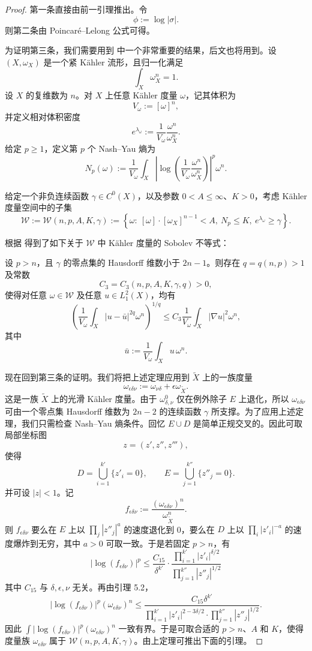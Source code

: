 \begin{proof}
第一条直接由前一引理推出。令
\[
\phi:=\log|\sigma|.
\]
则第二条由 Poincar\'e--Lelong 公式可得。

为证明第三条，我们需要用到 \cite{Go-Ph-So-Ja} 中一个非常重要的结果，后文也将用到。设 \((X,\omega_X)\) 是一个紧 Kähler 流形，且归一化满足
\[
\int_X \omega_X^n=1.
\]
设 \(X\) 的复维数为 \(n\)。对 \(X\) 上任意 Kähler 度量 \(\omega\)，记其体积为
\[
V_\omega:=[\omega]^n,
\]
并定义相对体积密度
\[
e^{\lambda_\omega}
:=
\frac{1}{V_\omega}\frac{\omega^n}{\omega_X^n}.
\]
给定 \(p\ge 1\)，定义第 \(p\) 个 Nash--Yau 熵为
\[
N_p(\omega)
:=
\frac1{V_\omega}
\int_X
\left|
\log\left(\frac1{V_\omega}\frac{\omega^n}{\omega_X^n}\right)
\right|^p\omega^n.
\]

给定一个非负连续函数 \(\gamma\in C^0(X)\)，以及参数 \(0<A\le \infty\)、\(K>0\)，考虑 Kähler 度量空间中的子集
\[
\mathcal W:=\mathcal W(n,p,A,K,\gamma)
:=
\left\{
\omega:\ [\omega]\cdot [\omega_X]^{n-1}<A,\ N_p\le K,\ e^{\lambda_\omega}\ge \gamma
\right\}.
\]

根据\cite[Theorem 2.1]{Go-Ph-So-Ja} 得到了如下关于 \(\mathcal{W}\) 中 Kähler 度量的 Sobolev 不等式：

\begin{theorem}
设 \(p>n\)，且 \(\gamma\) 的零点集的 Hausdorff 维数小于 \(2n-1\)。则存在 \(q=q(n,p)>1\) 及常数
\[
C_3=C_3(n,p,A,K,\gamma,q)>0,
\]
使得对任意 \(\omega\in\mathcal W\) 及任意 \(u\in L_1^2(X)\)，均有
\[
\left(
\frac1{V_\omega}\int_X |u-\bar u|^{2q}\omega^n
\right)^{1/q}
\le
C_3\frac1{V_\omega}\int_X |\nabla u|^2\omega^n,
\]
其中
\[
\bar u:=\frac1{V_\omega}\int_X u\,\omega^n.
\]
\end{theorem}

现在回到第三条的证明。我们将把上述定理应用到 \(\widetilde X\) 上的一族度量
\[
\omega_{\epsilon\delta\nu}:=\omega_{\nu\delta}+\epsilon\omega_{\widetilde X}.
\]
这是一族 \(\widetilde X\) 上的光滑 Kähler 度量。由于 \(\omega^0_{\delta,\nu}\) 仅在例外除子 \(E\) 上退化，所以 \(\omega_{\epsilon\delta\nu}\) 可由一个零点集 Hausdorff 维数为 \(2n-2\) 的连续函数 \(\gamma\) 所支撑。为了应用上述定理，我们只需检查 Nash--Yau 熵条件。回忆 \(E\cup D\) 是简单正规交叉的。因此可取局部坐标图
\[
z=(z',z'',z'''),
\]
使得
\[
D=\bigcup_{i=1}^{k'}\{z'_i=0\},\qquad
E=\bigcup_{j=1}^{k''}\{z''_j=0\}.
\]
并可设 \(|z|<1\)。记
\[
f_{\epsilon\delta\nu}:=
\frac{(\omega_{\epsilon\delta\nu})^n}{\omega_{\widetilde X}^n}.
\]
则 \(f_{\epsilon\delta\nu}\) 要么在 \(E\) 上以 \(\prod_j |z''_j|^a\) 的速度退化到 0，要么在 \(D\) 上以 \(\prod_i |z'_i|^{-a}\) 的速度爆炸到无穷，其中 \(a>0\) 可取一致。于是若固定 \(p>n\)，有
\[
|\log(f_{\epsilon\delta\nu})|^p
\le
\frac{C_{15}}{\delta^{k'}}
\cdot
\frac{\prod_{i=1}^{k'}|z'_i|^{\delta/2}}
{\prod_{j=1}^{k''}|z''_j|^{1/2}}
\]
其中 \(C_{15}\) 与 \(\delta,\epsilon,\nu\) 无关。再由引理 5.2，
\[
|\log(f_{\epsilon\delta\nu})|^p(\omega_{\epsilon\delta\nu})^n
\le
\frac{C_{15}\delta^{k'}}
{\prod_{i=1}^{k'}|z'_i|^{2-3\delta/2}\cdot \prod_{j=1}^{k''}|z''_j|^{1/2}}.
\]
因此 \(\int |\log(f_{\epsilon\delta\nu})|^p(\omega_{\epsilon\delta\nu})^n\) 一致有界。于是可取合适的 \(p>n\)、\(A\) 和 \(K\)，使得度量族 \(\omega_{\epsilon\delta\nu}\) 属于 \(\mathcal W(n,p,A,K,\gamma)\)。由上定理可推出下面的引理。
\end{proof}

